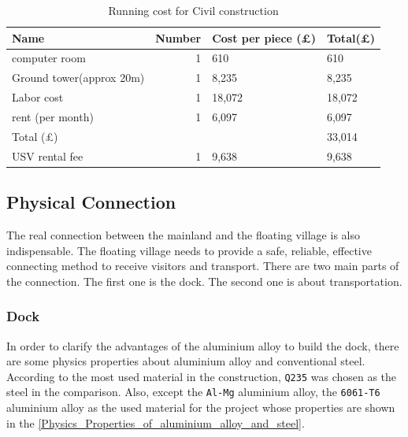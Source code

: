 \documentclass[11pt]{article}
\numberwithin{equation}{section}
\begin{document}
\begin{table}[H]
\caption{\label{CivilConstruction}Running cost for Civil construction}
\centering
\begin{tabular}{lrll}
\toprule
Name & Number & Cost per piece (\pounds) & Total(\pounds)\\
\midrule
computer room & 1 & 610 & 610\\
Ground tower(approx 20m) & 1 & 8,235 & 8,235\\
Labor cost & 1 & 18,072 & 18,072\\
rent (per month) & 1 & 6,097 & 6,097\\
\midrule
Total (\pounds) &  &  & 33,014\\
\midrule
USV rental fee & 1 & 9,638 & 9,638\\
\bottomrule
\end{tabular}
\end{table}

\subsection{Physical Connection}
\label{sec:org88c98ba}
The real connection between the mainland and the floating village is also indispensable. The floating village needs to provide a safe, reliable, effective connecting method to receive visitors and transport. There are two main parts of the connection. The first one is the dock. The second one is about transportation.

\subsubsection{Dock}
\label{sec:orgc66a593}
In order to clarify the advantages of the aluminium alloy to build the dock, there are some physics properties about aluminium alloy and conventional steel. According to the most used material in the construction, \texttt{Q235} was chosen as the steel in the comparison. Also, except the \texttt{Al-Mg} aluminium alloy, the \texttt{6061-T6} aluminium alloy as the used material for the project whose properties are shown in the  \ref{Physics_Properties_of_aluminium_alloy_and_steel}.
\end{document}
